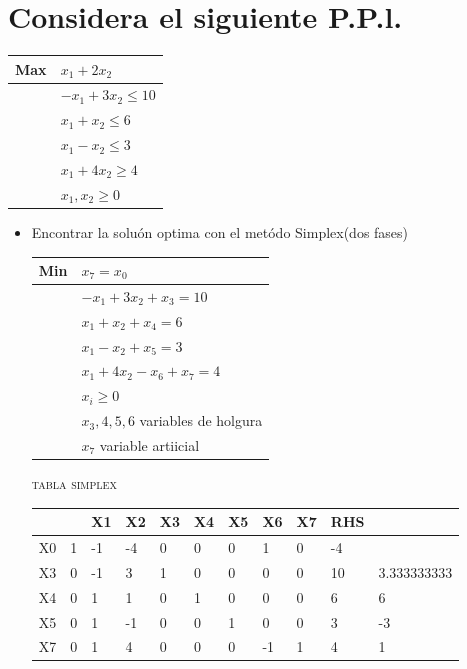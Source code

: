\section{Considera el siguiente P.P.l.}

    \begin{tabular}{|l|l|}
    \hline
        Max & $x_1+2x_2$ \\ \hline
        ~ & $-x_1+3x_2\leq 10$ \\ \hline
        ~ & $x_1+x_2\leq 6$ \\ \hline
        ~ & $x_1-x_2\leq 3$ \\ \hline
        ~ & $x_1+4x_2\geq 4$ \\ \hline
        ~ & $x_1, x_2 \geq 0$ \\ \hline
    \end{tabular}
    \begin{itemize}
        \item Encontrar la solu\'on optima con el met\'odo Simplex(dos fases) 
        
    \begin{tabular}{|l|l|}
    \hline
        Min & $x_7=x_0$ \\ \hline
        ~ & $-x_1+3x_2+x_3 = 10$ \\ \hline
        ~ & $x_1+x_2+x_4 = 6$ \\ \hline
        ~ & $x_1-x_2+x_5 = 3$ \\ \hline
        ~ & $x_1+4x_2-x_6+x_7= 4$ \\ \hline
        ~ & $x_i \geq 0$ \\ \hline
        & $x_3,4,5,6$ variables de holgura \\ \hline
        & $x_7$ variable artiicial \\ \hline
    \end{tabular}        
    
    \textsc{tabla simplex}

\begin{center}
\begin{tabular}{|l|l|l|l|l|l|l|l|l|l|l|}
\hline
   &   & X1 & X2                        & X3 & X4 & X5 & X6 & X7 & RHS &                           \\ \hline
X0 & 1 & -1 & -4                        & 0  & 0  & 0  & 1  & 0  & -4  &                           \\ \hline
X3 & 0 & -1 & 3                         & 1  & 0  & 0  & 0  & 0  & 10  & 3.333333333               \\ \hline
X4 & 0 & 1  & 1                         & 0  & 1  & 0  & 0  & 0  & 6   & 6                         \\ \hline
X5 & 0 & 1  & -1                        & 0  & 0  & 1  & 0  & 0  & 3   & -3                        \\ \hline
X7 & 0 & 1  & \cellcolor[HTML]{67FD9A}4 & 0  & 0  & 0  & -1 & 1  & 4   & \cellcolor[HTML]{67FD9A}1 \\ \hline
\end{tabular}
    

\end{center}
\end{itemize}
